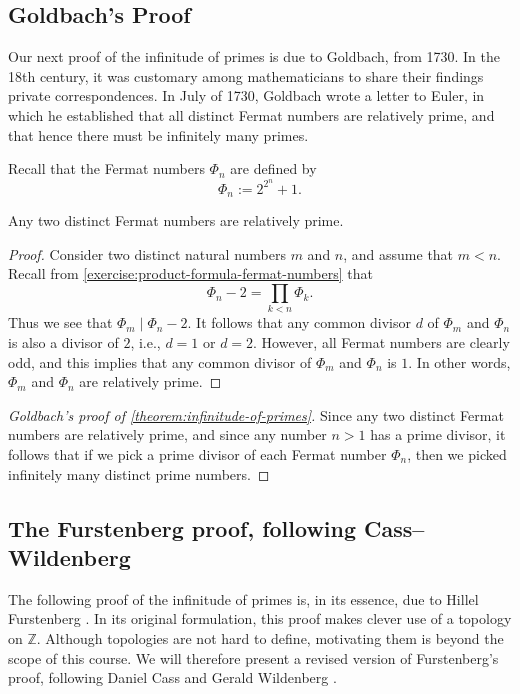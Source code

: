 \subsection*{Goldbach's Proof}

Our next proof of the infinitude of primes is due to Goldbach, from 1730. In the 18th century, it was customary among mathematicians to share their findings private correspondences. In July of 1730, Goldbach wrote a letter to Euler, in which he established that all distinct Fermat numbers are relatively prime, and that hence there must be infinitely many primes.

Recall that the Fermat numbers $\Phi_n$ are defined by
\begin{equation*}
  \Phi_n := 2^{2^n}+1.
\end{equation*}

\begin{lemma}
  Any two distinct Fermat numbers are relatively prime.
\end{lemma}

\begin{proof}
  Consider two distinct natural numbers $m$ and $n$, and assume that $m<n$. Recall from \cref{exercise:product-formula-fermat-numbers} that
  \begin{equation*}
    \Phi_n-2 = \prod_{k<n}\Phi_k.
  \end{equation*}
  Thus we see that $\Phi_m \mid \Phi_n - 2$. It follows that any common divisor $d$ of $\Phi_m$ and $\Phi_n$ is also a divisor of $2$, i.e., $d=1$ or $d=2$. However, all Fermat numbers are clearly odd, and this implies that any common divisor of $\Phi_m$ and $\Phi_n$ is $1$. In other words, $\Phi_m$ and $\Phi_n$ are relatively prime.
\end{proof}

\begin{proof}[Goldbach's proof of \cref{theorem:infinitude-of-primes}]
  Since any two distinct Fermat numbers are relatively prime, and since any number $n>1$ has a prime divisor, it follows that if we pick a prime divisor of each Fermat number $\Phi_n$, then we picked infinitely many distinct prime numbers.
\end{proof}

\subsection*{The Furstenberg proof, following Cass--Wildenberg}

The following proof of the infinitude of primes is, in its essence, due to Hillel Furstenberg \cite{furstenberg1955}. In its original formulation, this proof makes clever use of a topology on $\mathbb{Z}$. Although topologies are not hard to define, motivating them is beyond the scope of this course. We will therefore present a revised version of Furstenberg's proof, following Daniel Cass and Gerald Wildenberg \cite{cass2003}.

